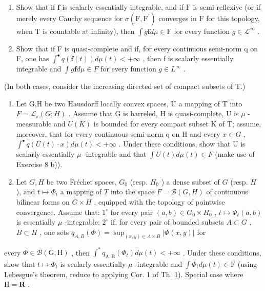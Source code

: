 \begin{enumerate}
\def\labelenumi{\alph{enumi})}
\item
  Show that if \(\mathbf{f}\) is scalarly essentially integrable, and if \(\mathrm{F}\) is semi-reflexive (or if merely every Cauchy sequence for \(\sigma (\mathrm{F},\mathrm{F}^{\prime})\) converges in \(\mathrm{F}\) for this topology, when \(\mathrm{T}\) is countable at infinity), then \(\int g\mathbf{f}d\mu \in \mathrm{F}\) for every function \(g\in \mathcal{L}^{\infty}\) .
\item
  Show that if F is quasi-complete and if, for every continuous semi-norm q on F, one has \(\int^{\bullet} q(\mathbf{f}(t)) d\mu(t) < +\infty\) , then f is scalarly essentially integrable and \(\int g\mathbf{f} d\mu \in F\) for every function \(g \in L^{\infty}\) .
\end{enumerate}

(In both cases, consider the increasing directed set of compact subsets of T.)

\begin{enumerate}
\def\labelenumi{\arabic{enumi})}
\setcounter{enumi}{8}
\item
  Let G,H be two Hausdorff locally convex spaces, U a mapping of T into \(F = \mathcal{L}_{s}(G;H)\) . Assume that G is barreled, H is quasi-complete, U is \(\mu\) -measurable and \(U(K)\) is bounded for every compact subset K of T; assume, moreover, that for every continuous semi-norm q on H and every \(x \in G\) , \(\int^{\bullet} q(U(t) \cdot x) d\mu(t) < +\infty\) . Under these conditions, show that U is scalarly essentially \(\mu\) -integrable and that \(\int U(t) d\mu(t) \in F\) (make use of Exercise 8 b)).
\item
  Let \(G, H\) be two Fréchet spaces, \(G_0\) (resp. \(H_0\) ) a dense subset of \(G\) (resp. \(H\) ), and \(t \mapsto \Phi_t\) a mapping of \(T\) into the space \(F = \mathcal{B}(G, H)\) of continuous bilinear forms on \(G \times H\) , equipped with the topology of pointwise convergence. Assume that: \(1^\circ\) for every pair \((a, b) \in G_0 \times H_0\) , \(t \mapsto \Phi_t(a, b)\) is essentially \(\mu\) -integrable; \(2^\circ\) if, for every pair of bounded subsets \(A \subset G\) , \(B \subset H\) , one sets \(q_{A,B}(\Phi) = \sup_{(x, y) \in A \times B} |\Phi(x, y)|\) for
\end{enumerate}

every \(\Phi \in \mathcal{B}(\mathrm{G},\mathrm{H})\) , then \(\int^{*}q_{\mathrm{A},\mathrm{B}}(\Phi_t)d\mu (t) < + \infty\) . Under these conditions, show that \(t\mapsto \Phi_t\) is scalarly essentially \(\mu\) -integrable and \(\int \Phi_t d\mu (t)\in \mathrm{F}\) (using Lebesgue's theorem, reduce to applying Cor. 1 of Th. 1). Special case where \(\mathrm{H} = \mathbf{R}\) .

